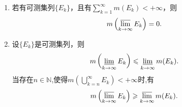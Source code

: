 \documentclass[../../main.tex]{subfiles}%
\begin{document}
\begin{theorem}\label{theorem:Borel-Cantelli引理}
\begin{enumerate}[(1)]
\item\label{theorem:Borel-Cantelli引理-1} 若有可测集列$\{E_k\}$，且有$\sum_{k = 1}^{\infty}m(E_k)<+\infty$，则
\begin{align*}
m\left(\varlimsup_{k\to\infty}E_k\right)= 0.
\end{align*}

\item\label{theorem:Borel-Cantelli引理-2} 设$\{E_k\}$是可测集列，则
\begin{align*}
m\left(\varliminf_{k\to\infty}E_k\right)\leqslant\varliminf_{k\to\infty}m(E_k).
\end{align*}
当存在$n\in \mathbb{N}$,使得$m\left( \bigcup_{k=n}^{\infty}{E_k} \right) <+\infty$时,有
\begin{align*}
m\left(\varlimsup_{k\to\infty}E_k\right)\geqslant\varlimsup_{k\to\infty}m(E_k).
\end{align*}
\end{enumerate}
\end{theorem}
\end{document}
